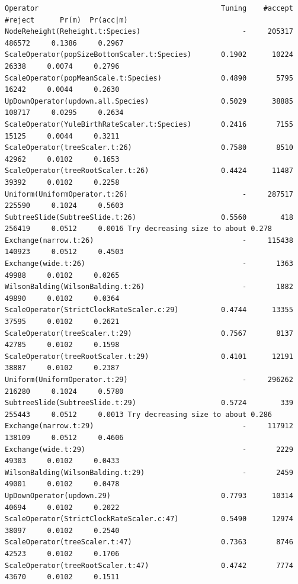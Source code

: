 \documentclass{article}
\begin{document}
{\begin{verbatim}
Operator                                           Tuning    #accept    #reject      Pr(m)  Pr(acc|m)
NodeReheight(Reheight.t:Species)                        -     205317     486572     0.1386     0.2967 
ScaleOperator(popSizeBottomScaler.t:Species)       0.1902      10224      26338     0.0074     0.2796 
ScaleOperator(popMeanScale.t:Species)              0.4890       5795      16242     0.0044     0.2630 
UpDownOperator(updown.all.Species)                 0.5029      38885     108717     0.0295     0.2634 
ScaleOperator(YuleBirthRateScaler.t:Species)       0.2416       7155      15125     0.0044     0.3211 
ScaleOperator(treeScaler.t:26)                     0.7580       8510      42962     0.0102     0.1653 
ScaleOperator(treeRootScaler.t:26)                 0.4424      11487      39392     0.0102     0.2258 
Uniform(UniformOperator.t:26)                           -     287517     225590     0.1024     0.5603 
SubtreeSlide(SubtreeSlide.t:26)                    0.5560        418     256419     0.0512     0.0016 Try decreasing size to about 0.278
Exchange(narrow.t:26)                                   -     115438     140923     0.0512     0.4503 
Exchange(wide.t:26)                                     -       1363      49988     0.0102     0.0265 
WilsonBalding(WilsonBalding.t:26)                       -       1882      49890     0.0102     0.0364 
ScaleOperator(StrictClockRateScaler.c:29)          0.4744      13355      37595     0.0102     0.2621 
ScaleOperator(treeScaler.t:29)                     0.7567       8137      42785     0.0102     0.1598 
ScaleOperator(treeRootScaler.t:29)                 0.4101      12191      38887     0.0102     0.2387 
Uniform(UniformOperator.t:29)                           -     296262     216280     0.1024     0.5780 
SubtreeSlide(SubtreeSlide.t:29)                    0.5724        339     255443     0.0512     0.0013 Try decreasing size to about 0.286
Exchange(narrow.t:29)                                   -     117912     138109     0.0512     0.4606 
Exchange(wide.t:29)                                     -       2229      49303     0.0102     0.0433 
WilsonBalding(WilsonBalding.t:29)                       -       2459      49001     0.0102     0.0478 
UpDownOperator(updown.29)                          0.7793      10314      40694     0.0102     0.2022 
ScaleOperator(StrictClockRateScaler.c:47)          0.5490      12974      38097     0.0102     0.2540 
ScaleOperator(treeScaler.t:47)                     0.7363       8746      42523     0.0102     0.1706 
ScaleOperator(treeRootScaler.t:47)                 0.4742       7774      43670     0.0102     0.1511 

\end{verbatim}}
\end{document}
